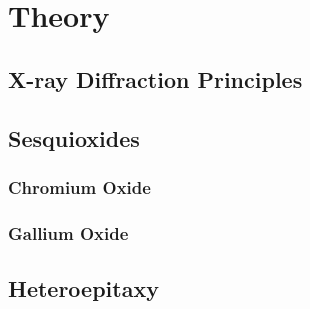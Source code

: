 \chapter{Theory}

\section{X-ray Diffraction Principles}
    
        \label{Sec:Theory_X-ray_diffraction}

\section{Sesquioxides}
    
    \subsection{Chromium Oxide}\label{Sec:Cr2O3}
        
    \subsection{Gallium Oxide}
        

\section{Heteroepitaxy}
    